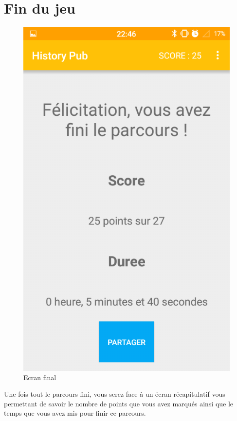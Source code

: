\documentclass[11pt]{scrreprt}
\begin{document}
    \section{Fin du jeu}
    \begin{figure}[H]
        \centering
        \includegraphics[scale=.25]{images/final.png}
        \caption{Ecran final}
    \end{figure}

    Une fois tout le parcours fini, vous serez face à un écran récapitulatif vous permettant de savoir le nombre de points que vous avez marqués ainsi que le temps que vous avez mis pour finir ce parcours.\\
\end{document}
